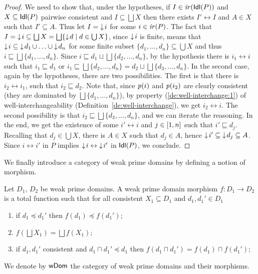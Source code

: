 \begin{proof}
  
  We need to show that, under the hypotheses, if
  $I \in \mathop{\mathit{ir}({\mathsf{Idl}({P})})}$ and $X \subseteq \mathsf{Idl}({P})$ pairwise
  consistent and $I \subseteq \bigsqcup X$ then there exists
  $I' \leftrightarrow I$ and $A \in X$ such that $I' \subseteq
  A$. Thus let $I = \mathop{\downarrow\!{i}}$ for some $i \in \mathop{\mathit{ir}({P})}$. The fact
  that
  $I = \mathop{\downarrow\!{i}} \subseteq \bigsqcup X = \bigsqcup \{
  \mathop{\downarrow\!{d}} \mid d \in \bigcup X \}$, since $\mathop{\downarrow\!{i}}$ is
  finite, means that
  $\mathop{\downarrow\!{i}} \subseteq \mathop{\downarrow\!{d_1}} \cup \ldots \cup
  \mathop{\downarrow\!{d_n}}$ for some finite subset
  $\{ d_1, \ldots, d_n \} \subseteq \bigcup X$ and thus
  $i \sqsubseteq \bigsqcup \{ d_1, \ldots, d_n \}$. Since
  $i \sqsubseteq d_1 \sqcup \bigsqcup \{ d_2, \ldots, d_n\}$, by the
  hypothesis there is $i_1 \leftrightarrow i$ such that
  $i_1 \sqsubseteq d_1$ or
  $i_1 \sqsubseteq \bigsqcup \{ d_2, \ldots, d_n\} = d_2 \sqcup
  \bigsqcup \{ d_3, \ldots, d_n\}$.
  In the second case, again by the hypotheses, there are two
  possibilities. The first is that there is $i_2 \leftrightarrow i_1$,
  such that $i_2 \sqsubseteq d_2$. Note that, since $\mathit{p}({i})$ and
  $\mathit{p}({i_2})$ are clearly consistent (they are dominated by
  $\bigsqcup \{ d_1, \ldots, d_n \}$), by property
  (\ref{de:well-interchange:1}) of well-interchangeability
  (Definition~\ref{de:well-interchange}), we get
  $i_2 \leftrightarrow i$.
  The second possibility is that
  ${i_2} \sqsubseteq \bigsqcup \{ d_3, \ldots, d_n\}$, and we can iterate the reasoning. 
  In the end, we get the existence of some
  $i' \leftrightarrow i$ and $j \in [{1},{n}]$ such that
  $i' \sqsubseteq d_j$. Recalling that $d_j \in \bigcup X$, there is
  ${A} \in X$ such that $d_j \in {A}$, hence
  $\mathop{\downarrow\!{{i'}}} \subseteq \mathop{\downarrow\!{d_j}} \subseteq
  {A}$. Since $i \leftrightarrow {i'}$ in $P$ implies
    $\mathop{\downarrow\!{i}} \leftrightarrow \mathop{\downarrow\!{{i'}}}$ in $\mathsf{Idl}({P})$,
    we conclude.
\end{proof}



We finally introduce a category of weak prime domains by defining a notion of morphism.

\begin{definition}
  \label{de:domain-category}
  Let $D_1$, $D_2$ be weak prime domains.
  A  weak prime domain morphism $f : D_1 \to D_2$ is a total function such that
  for all consistent $X_1 \subseteq D_1$ and $d_1, d_1' \in D_1$
  \begin{enumerate}
  \item if $d_1 \preceq d_1'$ then $f(d_1) \preceq f(d_1')$;
  \item $f(\bigsqcup X_1) = \bigsqcup f(X_1)$;
  \item if $d_1, d_1'$ consistent and
    $d_1 \sqcap d_1' \preceq d_1$ then
    $f(d_1 \sqcap d_1') = f(d_1) \sqcap f(d_1')$;
  \end{enumerate}
  We denote by $\mathsf{wDom}$ the category of weak prime domains
  and their morphisms.
\end{definition}

